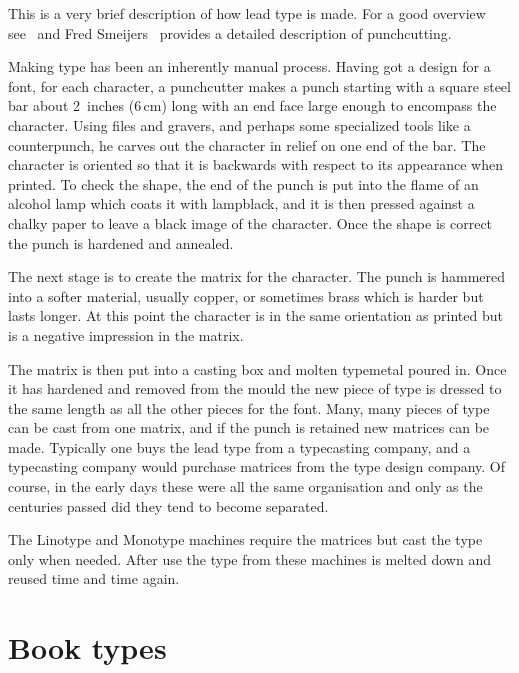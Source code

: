 \documentclass[10pt,a4paper,oneside,extrafontsizes]{memoir}%
\newcommand\U[2]{\textrm{#1}\,\textrm{#2}}
\begin{document}
\begin{paracol}{2}
\switchEng

    This is a very brief description of how lead type is made. For
a good overview see~\autocite{CHAPPELL99} and Fred Smeijers~\autocite{SMEIJERS96}
provides a detailed description of punchcutting.
 
Making type has been an inherently manual process. Having got a design
for a font, for each character, a punchcutter makes a punch starting
with a square steel bar about 2~inches (\U{6}{cm}) long with
an end face large enough to encompass the character. Using files and
gravers, and perhaps some specialized tools like a counterpunch, he
carves out the character in relief on one end of the bar. The
character is oriented so that it is backwards with respect to its
appearance when printed.  To check the shape, the end of the punch is
put into the flame of an alcohol lamp which coats it with lampblack,
and it is then pressed against a chalky paper to leave a black image
of the character. Once the shape is correct the punch is hardened and
annealed.

   The next stage is to create the matrix for the character. The punch is
hammered into a softer material, usually copper, or sometimes brass which
is harder but lasts longer. At this point the character is in the same
orientation as printed but is a negative impression in the matrix.

   The matrix is then put into a casting box and molten typemetal poured in.
Once it has hardened and removed from the mould the new piece of type is 
dressed to the same length as all the other pieces for the font. Many, many 
pieces of type can be cast from one matrix, and if the punch is retained new
matrices can be made. Typically one buys the lead type from a typecasting
company, and a typecasting company would purchase matrices from the type
design company. Of course, in the early days these were all the same 
organisation and only as the centuries passed did they tend to become
separated.

   The Linotype and Monotype machines 
require the matrices but cast the type only when needed. After use the type 
from these machines is melted down and reused time and time again.
\end{paracol}

\section{Book types}
\end{document}
